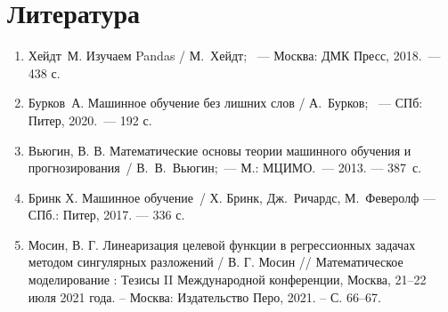 \documentclass[a4paper,12pt]{article}
\begin{document}
\section{Литература}

\begin{enumerate}
	\item Хейдт М. Изучаем Pandas / М. Хейдт;  — Москва: ДМК Пресс, 2018. — 438 с. 
	\item Бурков А. Машинное обучение без лишних слов / А. Бурков;  — СПб: Питер, 2020. — 192 с.
	\item Вьюгин, В. В. Математические основы теории машинного обучения и прогнозирования / В. В. Вьюгин; — М.: МЦИМО. — 2013. — 387~с. 
	\item Бринк Х. Машинное обучение / Х. Бринк, Дж. Ричардс, М. Феверолф  — СПб.: Питер, 2017. — 336 с.
	\item Мосин, В. Г. Линеаризация целевой функции в регрессионных задачах методом сингулярных разложений / В. Г. Мосин // Математическое моделирование : Тезисы II Международной конференции, Москва, 21–22 июля 2021 года. – Москва: Издательство Перо, 2021. – С. 66--67.
\end{enumerate}
\end{document}
